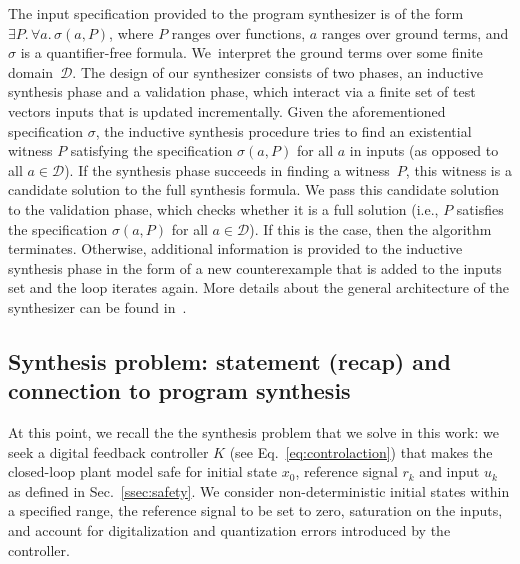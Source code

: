 \documentclass[runningheads,a4paper]{llncs}
\begin{document}
The input specification provided to the program synthesizer is of the form
$\exists P .\, \forall a.\, \sigma(a, P)$, where $P$ ranges over functions,
$a$ ranges over ground terms, and $\sigma$ is a quantifier-free formula. 
We~interpret the ground terms over some finite domain~$\mathcal{D}$.
%
The design of our synthesizer consists of two phases, an inductive synthesis
phase and a validation phase, which interact via a finite set of test
vectors {\sc inputs} that is updated incrementally.  Given the
aforementioned specification $\sigma$, the inductive synthesis procedure
tries to find an existential witness $P$ satisfying the specification
$\sigma(a, P)$ for all $a$ in {\sc inputs} (as opposed to all $a \in
\mathcal{D}$).
%
If the synthesis phase succeeds in finding a witness~$P$, this witness is a
candidate solution to the full synthesis formula.  We pass this candidate
solution to the validation phase, which checks whether it is a full solution
(i.e., $P$ satisfies the specification $\sigma(a, P)$ for all
$a\in\mathcal{D}$).  If this is the case, then the algorithm terminates. 
Otherwise, additional information is provided to the inductive synthesis
phase in the form of a new counterexample that is added to the {\sc inputs}
set and the loop iterates again.  More details about the general
architecture of the synthesizer can be found
in~\cite{DBLP:conf/lpar/DavidKL15}.
%

\subsection{Synthesis problem: statement (recap) and connection to program synthesis}


At this point, we recall the the synthesis problem that we solve in this
work: we seek a digital feedback controller $K$ (see
Eq.~\ref{eq:controlaction}) that makes the closed-loop plant model safe for
initial state $x_0$, reference signal $r_k$ and input $u_k$ as defined in
Sec.~\ref{ssec:safety}.  We consider non-deterministic initial states within
a specified range, the reference signal to be set to zero, saturation on the
inputs, and account for digitalization and quantization errors introduced by
the controller.
\end{document}
